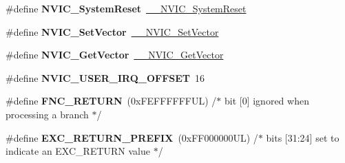 \begin{DoxyCompactItemize}
\item 
\mbox{\label{group___c_m_s_i_s___core___n_v_i_c_functions_ga6aa0367d3642575610476bf0366f0c48}} 
\#define {\bfseries N\+V\+I\+C\+\_\+\+System\+Reset}~\hyperlink{group___c_m_s_i_s___core___n_v_i_c_functions_ga0d9aa2d30fa54b41eb780c16e35b676c}{\+\_\+\+\_\+\+N\+V\+I\+C\+\_\+\+System\+Reset}
\item 
\mbox{\label{group___c_m_s_i_s___core___n_v_i_c_functions_ga804af63bb4c4c317387897431814775d}} 
\#define {\bfseries N\+V\+I\+C\+\_\+\+Set\+Vector}~\hyperlink{group___c_m_s_i_s___core___n_v_i_c_functions_ga0df355460bc1783d58f9d72ee4884208}{\+\_\+\+\_\+\+N\+V\+I\+C\+\_\+\+Set\+Vector}
\item 
\mbox{\label{group___c_m_s_i_s___core___n_v_i_c_functions_ga955eb1c33a3dcc62af11a8385e8c0fc8}} 
\#define {\bfseries N\+V\+I\+C\+\_\+\+Get\+Vector}~\hyperlink{group___c_m_s_i_s___core___n_v_i_c_functions_ga44b665d2afb708121d9b10c76ff00ee5}{\+\_\+\+\_\+\+N\+V\+I\+C\+\_\+\+Get\+Vector}
\item 
\mbox{\label{group___c_m_s_i_s___core___n_v_i_c_functions_ga8045d905a5ca57437d8e6f71ffcb6df5}} 
\#define {\bfseries N\+V\+I\+C\+\_\+\+U\+S\+E\+R\+\_\+\+I\+R\+Q\+\_\+\+O\+F\+F\+S\+ET}~16
\item 
\mbox{\label{group___c_m_s_i_s___core___n_v_i_c_functions_gabaa62910bf89acc186ae998c611e64ab}} 
\#define {\bfseries F\+N\+C\+\_\+\+R\+E\+T\+U\+RN}~(0x\+F\+E\+F\+F\+F\+F\+F\+F\+U\+L)     /$\ast$ bit \mbox{[}0\mbox{]} ignored when processing a branch                             $\ast$/
\item 
\mbox{\label{group___c_m_s_i_s___core___n_v_i_c_functions_ga99e0c1c19f050880a8bd827a7f420bec}} 
\#define {\bfseries E\+X\+C\+\_\+\+R\+E\+T\+U\+R\+N\+\_\+\+P\+R\+E\+F\+IX}~(0x\+F\+F000000\+U\+L)     /$\ast$ bits \mbox{[}31\+:24\mbox{]} set to indicate an E\+X\+C\+\_\+\+R\+E\+T\+U\+R\+N value                     $\ast$/
\item 
\mbox{\label{group___c_m_s_i_s___core___n_v_i_c_functions_ga88711355d0196b1ffeb18c33e2c95360}} 

\end{DoxyCompactItemize}
